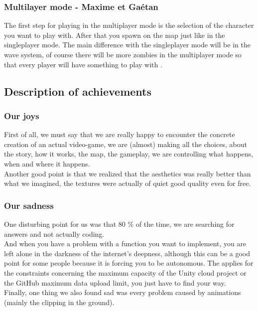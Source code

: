 \documentclass[12pt]{article}
\begin{document}
	\subsubsection{Multilayer mode - Maxime et Ga\'etan}

		The first step for playing in the multiplayer mode is the selection of the character you want to play with. After that you spawn on the map just like in the singleplayer mode. The main difference with the singleplayer mode will be in the wave system, of course there will be more zombies in the multiplayer mode so that every player will have \guillemotleft \space something to play with \guillemotright \space.
        \bigskip
        



\subsection{Description of achievements}
	\subsubsection{Our joys}
		
        First of all, we must say that we are really happy to encounter the concrete creation of an actual video-game, we are (almost) making all the choices, about the story, how it works, the map, the gameplay, we are controlling what happens, when and where it happens.\\
        Another good point is that we realized that the aesthetics was really better than what we imagined, the textures were actually of quiet good quality even for free.\\
        

	\subsubsection{Our sadness}

		One disturbing point for us was that 80 \% of the time, we are searching for answers and not actually coding.\\
        And when you have a problem with a function you want to implement, you are left alone in the darkness of the internet's deepness, although this can be a good point for some people because it is forcing you to be autonomous. The applies for the constraints concerning the maximum capacity of the Unity cloud project or the GitHub maximum data upload limit, you just have to find your way.\\
        \bigskip
        Finally, one thing we also found sad was every problem caused by animations (mainly the clipping in the ground).
        \bigskip
        \bigskip
\end{document}
